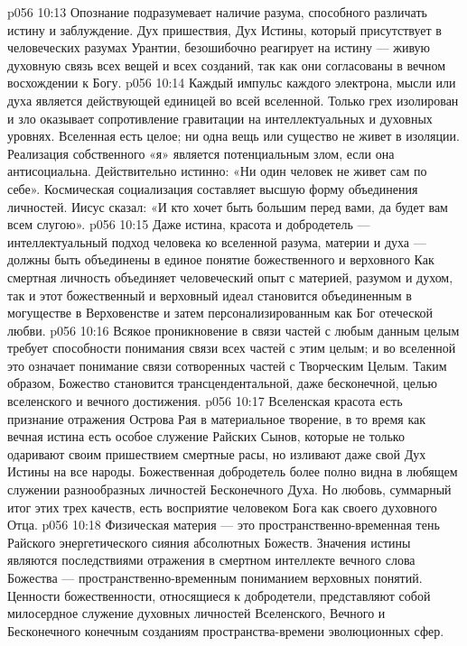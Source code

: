 \vs p056 10:13 \pc Опознание  подразумевает наличие разума, способного различать истину и заблуждение. Дух пришествия, Дух Истины, который присутствует в человеческих разумах Урантии, безошибочно реагирует на истину --- живую духовную связь всех вещей и всех созданий, так как они согласованы в вечном восхождении к Богу.
\vs p056 10:14 Каждый импульс каждого электрона, мысли или духа является действующей единицей во всей вселенной. Только грех изолирован и зло оказывает сопротивление гравитации на интеллектуальных и духовных уровнях. Вселенная есть целое; ни одна вещь или существо не живет в изоляции. Реализация собственного «я» является потенциальным злом, если она антисоциальна. Действительно истинно: «Ни один человек не живет сам по себе». Космическая социализация составляет высшую форму объединения личностей. Иисус сказал: «И кто хочет быть большим перед вами, да будет вам всем слугою».
\vs p056 10:15 Даже истина, красота и добродетель --- интеллектуальный подход человека ко вселенной разума, материи и духа --- должны быть объединены в единое понятие божественного и верховного  Как смертная личность объединяет человеческий опыт с материей, разумом и духом, так и этот божественный и верховный идеал становится объединенным в могуществе в Верховенстве и затем персонализированным как Бог отеческой любви.
\vs p056 10:16 Всякое проникновение в связи частей с любым данным целым требует способности понимания связи всех частей с этим целым; и во вселенной это означает понимание связи сотворенных частей с Творческим Целым. Таким образом, Божество становится трансцендентальной, даже бесконечной, целью вселенского и вечного достижения.
\vs p056 10:17 \pc Вселенская красота есть признание отражения Острова Рая в материальное творение, в то время как вечная истина есть особое служение Райских Сынов, которые не только одаривают своим пришествием смертные расы, но изливают даже свой Дух Истины на все народы. Божественная добродетель более полно видна в любящем служении разнообразных личностей Бесконечного Духа. Но любовь, суммарный итог этих трех качеств, есть восприятие человеком Бога как своего духовного Отца.
\vs p056 10:18 Физическая материя --- это пространственно\hyp{}временная тень Райского энергетического сияния абсолютных Божеств. Значения истины являются последствиями отражения в смертном интеллекте вечного слова Божества --- пространственно\hyp{}временным пониманием верховных понятий. Ценности божественности, относящиеся к добродетели, представляют собой милосердное служение духовных личностей Вселенского, Вечного и Бесконечного конечным созданиям пространства\hyp{}времени эволюционных сфер.
